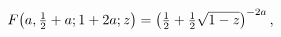 \[\mathop{F\/}\nolimits\!\left(a,\tfrac{1}{2}+a;1+2a;z\right)=\left(\tfrac{1}{2}%
+\tfrac{1}{2}\sqrt{1-z}\right)^{-2a},\]